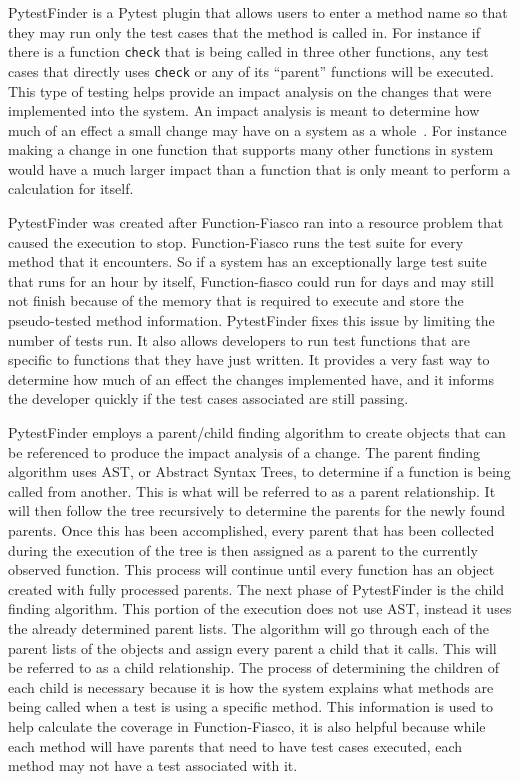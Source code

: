 PytestFinder is a Pytest plugin that allows users to enter a method name so that they may run only the test cases that the method is called in. For instance if there is a function \texttt{check} that is being called in three other functions, any test cases that directly uses \texttt{check} or any of its ``parent'' functions will be executed. This type of testing helps provide an impact analysis on the changes that were implemented into the system. An impact analysis is meant to determine how much of an effect a small change may have on a system as a whole~\cite{goknil2016rule}. For instance making a change in one function that supports many other functions in system would have a much larger impact than a function that is only meant to perform a calculation for itself.

PytestFinder was created after Function-Fiasco ran into a resource problem that caused the execution to stop. Function-Fiasco runs the test suite for every method that it encounters. So if a system has an exceptionally large test suite that runs for an hour by itself, Function-fiasco could run for days and may still not finish because of the memory that is required to execute and store the pseudo-tested method information. PytestFinder fixes this issue by limiting the number of tests run. It also allows developers to run test functions that are specific to functions that they have just written. It provides a very fast way to determine how much of an effect the changes implemented have, and it informs the developer quickly if the test cases associated are still passing.

PytestFinder employs a parent/child finding algorithm to create objects that can be referenced to produce the impact analysis of a change. The parent finding algorithm uses AST, or Abstract Syntax Trees, to determine if a function is being called from another. This is what will be referred to as a parent relationship. It will then follow the tree recursively to determine the parents for the newly found parents. Once this has been accomplished, every parent that has been collected during the execution of the tree is then assigned as a parent to the currently observed function. This process will continue until every function has an object created with fully processed parents. The next phase of PytestFinder is the child finding algorithm. This portion of the execution does not use AST, instead it uses the already determined parent lists. The algorithm will go through each of the parent lists of the objects and assign every parent a child that it calls. This will be referred to as a child relationship. The process of determining the children of each child is necessary because it is how the system explains what methods are being called when a test is using a specific method. This information is used to help calculate the coverage in Function-Fiasco, it is also helpful because while each method will have parents that need to have test cases executed, each method may not have a test associated with it.

